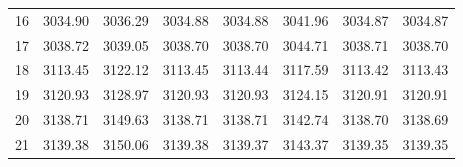 \documentclass[10pt,oneside]{article}
\begin{document}
\begin{table}[h!]
\begin{tabular}{cccccccc}
16 &   3034.90 & 3036.29 & 3034.88 & 3034.88 &      3041.96 & 3034.87 & 3034.87 \\
17 &   3038.72 & 3039.05 & 3038.70 & 3038.70 &      3044.71 & 3038.71 & 3038.70 \\
18 &   3113.45 & 3122.12 & 3113.45 & 3113.44 &      3117.59 & 3113.42 & 3113.43 \\
19 &   3120.93 & 3128.97 & 3120.93 & 3120.93 &      3124.15 & 3120.91 & 3120.91 \\
20 &   3138.71 & 3149.63 & 3138.71 & 3138.71 &      3142.74 & 3138.70 & 3138.69 \\
21 &   3139.38 & 3150.06 & 3139.38 & 3139.37 &      3143.37 & 3139.35 & 3139.35 \\
\bottomrule
\end{tabular}
\end{table}

\clearpage
\end{document}
